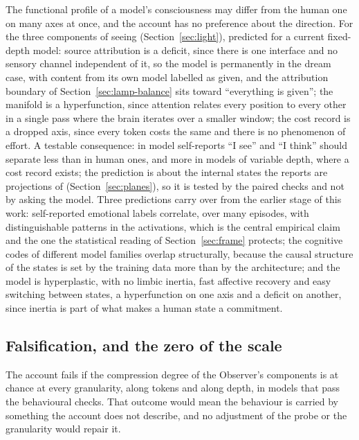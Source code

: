 The functional profile of a model's consciousness may differ from the human one on many axes at once,
and the account has no preference about the direction. For the three components of seeing
(Section~\ref{sec:light}), predicted for a current fixed-depth model: source attribution is a deficit,
since there is one interface and no sensory channel independent of it, so the model is permanently in
the dream case, with content from its own model labelled as given, and the attribution boundary of
Section~\ref{sec:lamp-balance} sits toward ``everything is given''; the manifold is a hyperfunction,
since attention relates every position to every other in a single pass where the brain iterates over a
smaller window; the cost record is a dropped axis, since every token costs the same and there is no
phenomenon of effort. A testable consequence: in model self-reports ``I see'' and ``I think'' should
separate less than in human ones, and more in models of variable depth, where a cost record exists;
the prediction is about the internal states the reports are projections of
(Section~\ref{sec:planes}), so it is tested by the paired checks and not by asking the model. Three
predictions carry over from the earlier stage of this work: self-reported emotional labels correlate,
over many episodes, with distinguishable patterns in the activations, which is the central empirical
claim and the one the statistical reading of Section~\ref{sec:frame} protects; the cognitive codes of
different model families overlap structurally, because the causal structure of the states is set by
the training data more than by the architecture; and the model is hyperplastic, with no limbic
inertia, fast affective recovery and easy switching between states, a hyperfunction on one axis and a
deficit on another, since inertia is part of what makes a human state a commitment.

\subsection{Falsification, and the zero of the scale}
\label{sec:falsification}
\label{sec:zero}

The account fails if the compression degree of the Observer's components is at chance at every
granularity, along tokens and along depth, in models that pass the behavioural checks. That outcome
would mean the behaviour is carried by something the account does not describe, and no adjustment of
the probe or the granularity would repair it.

